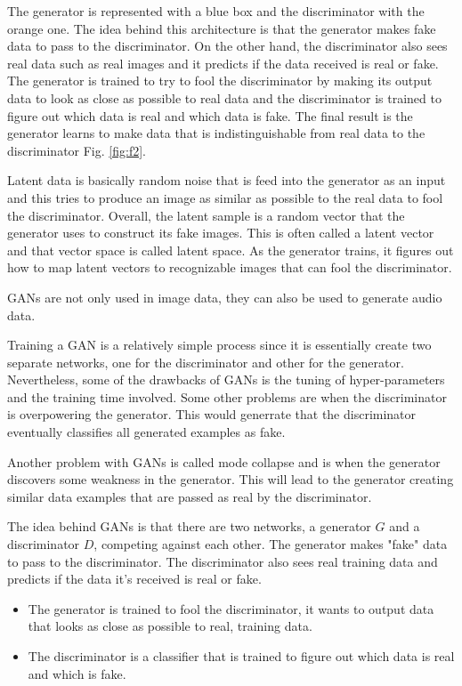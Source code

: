\documentclass{article}
\begin{document}
The generator is represented with a blue box and the discriminator with the orange one. 
The idea behind this architecture is that the generator makes fake data to pass to the discriminator. On the other hand, the discriminator also sees real data such as real images and it predicts if the data received is real or fake. The generator is trained to try to fool the discriminator by making its output data to look as close as possible to real data and the discriminator is trained to figure out which data is real and which data is fake. The final result is the generator learns to make data that is indistinguishable from real data to the discriminator Fig. \ref{fig:f2}.

Latent data is basically random noise that is feed into the generator as an input and this tries to produce an image as similar as possible to the real data to fool the discriminator. Overall, the latent sample is a random vector that the generator uses to construct its fake images. This is often called a latent vector and that vector space is called latent space. As the generator trains, it figures out how to map latent vectors to recognizable images that can fool the discriminator.

GANs are not only used in image data, they can also be used to generate audio data.

Training a GAN is a relatively simple process since it is essentially create two separate networks, one for the discriminator and other for the generator. Nevertheless, some of the drawbacks of GANs is the tuning of hyper-parameters and the training time involved.
Some other problems are when the discriminator is overpowering the generator. This would generrate that the discriminator eventually classifies all generated examples as fake.

Another problem with GANs is called mode collapse and is when the generator discovers some weakness in the generator. This will lead to the generator creating similar data examples that are passed as real by the discriminator.

The idea behind GANs is that there are two networks, a generator \(G\) and a discriminator \(D\), competing against each other. The generator makes "fake" data to pass to the discriminator. The discriminator also sees real training data and predicts if the data it's received is real or fake.

\begin{itemize}
    \item The generator is trained to fool the discriminator, it wants to output data that looks as close as possible to real, training data.
    \item The discriminator is a classifier that is trained to figure out which data is real and which is fake.
\end{itemize}
\end{document}
